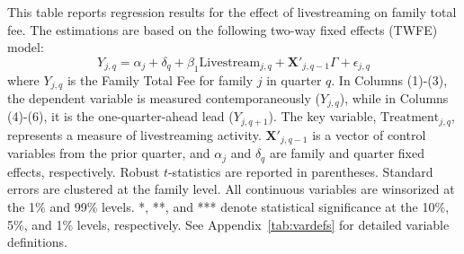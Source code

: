 \begin{table}[!ht]
    \centering
    
    \caption{Dynamic Livestream Effect on Family Total Fee}\label{tab:family_twfe_totalfee_reallocation}
    
    \begin{minipage}{0.95\textwidth}
        \footnotesize
        This table reports regression results for the effect of livestreaming on family total fee. The estimations are based on the following two-way fixed effects (TWFE) model:
        \begin{equation*}
            Y_{j,q} = \alpha_j + \delta_q + \beta_1 \text{Livestream}_{j,q} + \mathbf{X}'_{j,q-1} \Gamma + \epsilon_{j,q}
        \end{equation*}
        where $Y_{j,q}$ is the Family Total Fee for family $j$ in quarter $q$. In Columns (1)-(3), the dependent variable is measured contemporaneously ($Y_{j,q}$), while in Columns (4)-(6), it is the one-quarter-ahead lead ($Y_{j,q+1}$). The key variable, $\text{Treatment}_{j,q}$, represents a measure of livestreaming activity. $\mathbf{X}'_{j,q-1}$ is a vector of control variables from the prior quarter, and $\alpha_j$ and $\delta_q$ are family and quarter fixed effects, respectively. Robust $t$-statistics are reported in parentheses. Standard errors are clustered at the family level. All continuous variables are winsorized at the 1\% and 99\% levels. *, **, and *** denote statistical significance at the 10\%, 5\%, and 1\% levels, respectively. See Appendix~\ref{tab:vardefs} for detailed variable definitions. %
    \end{minipage}

    \vspace{2mm}

     
    
\end{table}